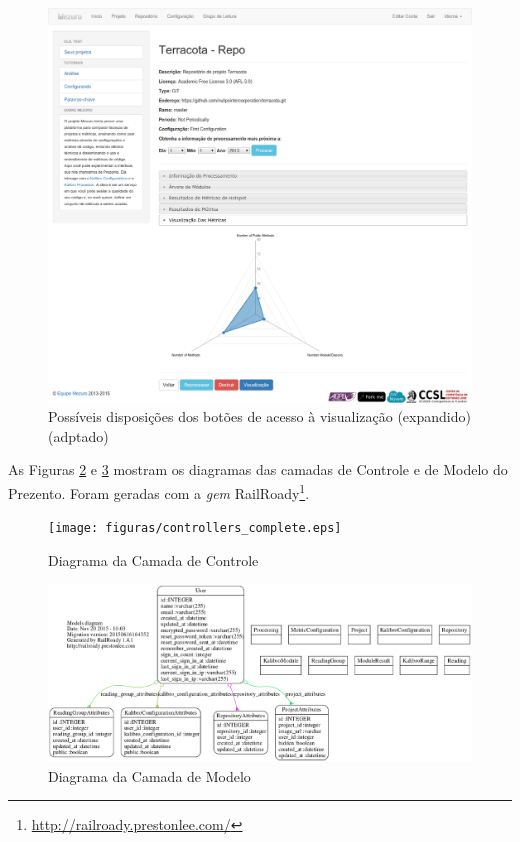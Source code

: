 \begin{figure}[!htb]
	\centering
    \includegraphics[keepaspectratio=true,scale=0.33]
    {figuras/exmplo_disposicao_botao_visualizacao_2.eps}
  \caption{Possíveis disposições dos botões de acesso à visualização
  (expandido) (adptado) \cite{filgueiras2014mezuro}}
  \label{fig:exmplo_disposicao_botao_visualizacao_2}
\end{figure}

\newpage

As Figuras \ref{fig:controllers_complete} e \ref{fig:models_complete} mostram os
diagramas das camadas de Controle e de Modelo do Prezento. Foram geradas com a
\textit{gem} RailRoady\footnote{\url{http://railroady.prestonlee.com/}}.


\begin{figure}[!htb]
	\centering
    \texttt{[image: figuras/controllers\_complete.eps]}
  \caption{Diagrama da Camada de Controle}
  \label{fig:controllers_complete}
\end{figure}

\begin{figure}[!htb]
	\centering
    \includegraphics[keepaspectratio=true,scale=0.35]
    {figuras/models_complete_v2.eps}
  \caption{Diagrama da Camada de Modelo}
  \label{fig:models_complete}
\end{figure}

